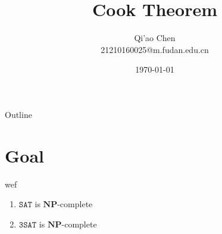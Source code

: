 \documentclass[presentation]{beamer}
\author{Qi'ao Chen\\21210160025@m.fudan.edu.cn}
\date{\today}
\title{Cook Theorem}
\def \NP {\textbf{NP}}
\def \NP {\textbf{NP}}
\def \SAT {\texttt{SAT}}
\def \TSAT {\texttt{3SAT}}
\begin{document}
\maketitle
\begin{frame}{Outline}
\tableofcontents
\end{frame}

\section{Goal}
\label{sec:org4906bd9}
\begin{frame}[label={sec:org4c5dd34}]{​wef}
\begin{theorem}
\begin{enumerate}
\item \(\SAT\) is \(\NP\)-complete
\item \(\TSAT\) is \(\NP\)-complete
\end{enumerate}
\end{theorem}
\end{frame}
\end{document}
